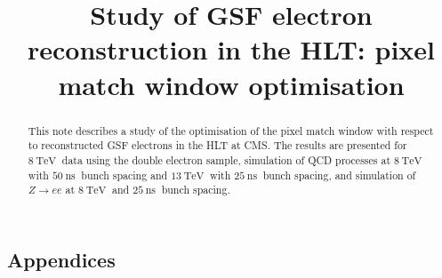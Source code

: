 \documentclass{cmspaper}
\newcommand{\ns} {~\mathrm{ns\ }}
\newcommand{\tev}{~\mathrm{TeV\ }}
\begin{document}
\title{Study of GSF electron reconstruction in the HLT: pixel match window optimisation}

\begin{abstract}
This note describes a study of the optimisation of the pixel match window with respect to reconstructed GSF electrons in the HLT at CMS.  The results are presented for $8\tev$ data using the double electron sample, simulation of QCD processes at $8\tev$ with $50\ns$ bunch spacing and $13\tev$ with $25\ns$ bunch spacing, and simulation of $Z\to ee$ at $8\tev$ and $25\ns$ bunch spacing.
\end{abstract}

\tableofcontents



\clearpage

\clearpage

\clearpage


\clearpage
\begin{appendix}
\section{Appendices}


\clearpage

\clearpage

\clearpage

\clearpage

\end{appendix}
\end{document}
